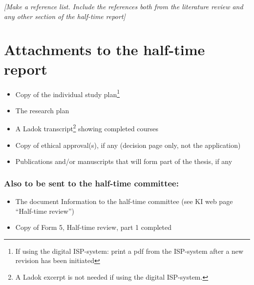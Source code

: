 \documentclass{kihalftime}
\begin{document}
\newpage
{}
{ \small \textit{[Make a reference list. Include the references both from the literature review and any other section of the half-time report]}}
\printbibliography 

\newpage
\section*{Attachments to the half-time report}
\begin{itemize}
    \item Copy of the individual study plan\footnote{If using the digital ISP-system: print a pdf from the ISP-system after a new revision has been initiated}
    \item The research plan  
    \item A Ladok transcript\footnote{A Ladok excerpt is not needed if using the digital ISP-system.} showing completed courses
    \item Copy of ethical approval(s), if any (decision page only, not the application)
    \item Publications and/or manuscripts that will form part of the thesis, if any
\end{itemize}

\subsubsection*{Also to be sent to the half-time committee:}
\begin{itemize}
    \item The document Information to the half-time committee (see KI web page “Half-time review”)
    \item Copy of Form 5, Half-time review, part 1 completed 
\end{itemize}

\end{document}
